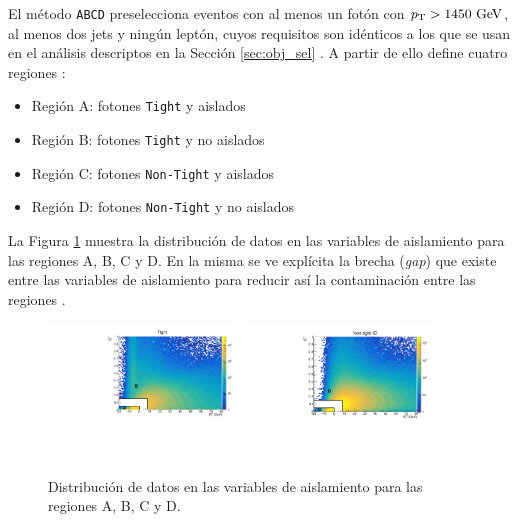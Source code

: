 El método \texttt{ABCD} preselecciona eventos con al menos un fotón con $p_{\text{T}}>1450\ \text{GeV}$, al menos dos jets y ningún leptón, cuyos requisitos son idénticos a los que se usan en el análisis descriptos en la Sección \ref{sec:obj_sel} . A partir de ello define cuatro regiones \cite{ATL-COM-PHYS-2016-1626}:

\begin{itemize}
  \item Región A: fotones \texttt{Tight} y aislados
  \item Región B: fotones \texttt{Tight} y no aislados
  \item Región C: fotones \texttt{Non-Tight} y aislados
  \item Región D: fotones \texttt{Non-Tight} y no aislados
\end{itemize}

La Figura \ref{fig:abcd_regions} muestra la distribución de datos en las variables de aislamiento para las regiones A, B, C y D. En la misma se ve explícita la brecha (\textit{gap}) que existe entre las variables de aislamiento para reducir así la contaminación entre las regiones .

\begin{figure}
  \centering
  \includegraphics[width=0.45\textwidth]{images/analysis/tight_ABCD_data.pdf}
  \includegraphics[width=0.45\textwidth]{images/analysis/nontight_ABCD_data.pdf}
  \caption{Distribución de datos en las variables de aislamiento para las regiones A, B, C y D.}
  \label{fig:abcd_regions}
\end{figure}


